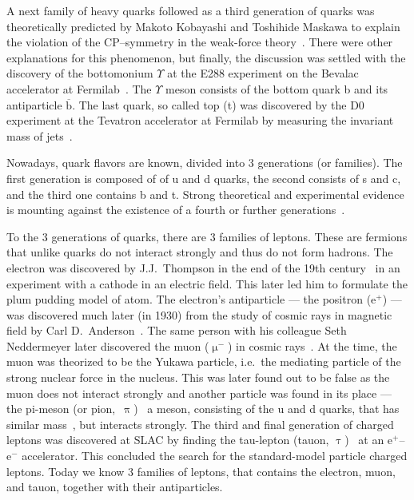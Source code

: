 A next family of heavy quarks followed as a third generation of quarks was theoretically predicted by Makoto Kobayashi and Toshihide Maskawa to explain the violation of the CP--symmetry in the weak-force theory~\cite{KobayashiMaskawa}\@. There were other explanations for this phenomenon, but finally, the discussion was settled with the discovery of the bottomonium $\Upsilon$ at the E288 experiment on the Bevalac accelerator at Fermilab~\cite{bottomDiscovery}\@. The $\Upsilon$ meson consists of the bottom quark b and its antiparticle $\overline{\mathrm{b}}$\@. The last quark, so called top (t) was discovered by the D0 experiment at the Tevatron accelerator at Fermilab by measuring the invariant mass of jets~\cite{topQuark}. 

Nowadays, quark flavors are known, divided into 3 generations (or families)\@. The first generation is composed of of u and d quarks, the second consists of s and c, and the third one contains b and t. Strong theoretical and experimental evidence is mounting against the existence of a fourth or further generations~\cite{fourGensPhysLettB,fourGensPRL}.

To the 3 generations of quarks, there are 3 families of leptons. These are fermions that unlike quarks do not interact strongly and thus do not form hadrons. The electron was discovered by J.J.\ Thompson in the end of the 19th century~\cite{thomson1897cathode} in an experiment with a cathode in an electric field\@. This later led him to formulate the plum pudding model of atom. The electron's antiparticle --- the positron (e$^+$) --- was discovered much later (in 1930) from the study of cosmic rays in magnetic field by Carl D.\ Anderson~\cite{positron}\@. The same person with his colleague Seth Neddermeyer later discovered the muon ($\upmu^-$) in cosmic rays~\cite{muon}\@. At the time, the muon was theorized to be the Yukawa particle, i.e.\ the mediating particle of the strong nuclear force in the nucleus. This was later found out to be false as the muon does not interact strongly and another particle was found in its place --- the pi-meson (or pion,~$\uppi$)~\cite{pion} a meson, consisting of the u and d quarks, that has similar mass~\cite{PDG}, but interacts strongly. The third and final generation of charged leptons was discovered at SLAC by finding the tau-lepton (tauon, $\uptau$)~\cite{tau} at an e$^+$--e$^-$ accelerator\@. This concluded the search for the standard-model particle charged leptons. Today we know 3 families of leptons, that contains the electron, muon, and tauon, together with their antiparticles.


